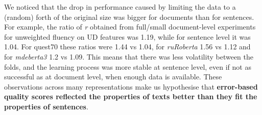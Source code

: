 We noticed that the drop in performance caused by limiting the data to a (random) forth of the original size was bigger for documents than for sentences. For example, the ratio of \textit{r} obtained from full/small document-level experiments for unweighted fluency on UD features was 1.19, while for sentence level it was 1.04. For quest70 these ratios were 1.44 vs 1.04, for \textit{ruRoberta} 1.56 vs 1.12 and for \textit{mdeberta3} 1.2 vs 1.09.
This means that there was less volatility between the folds, and the learning process was more stable at sentence level, even if not as successful as at document level, when enough data is available. 
These observations across many representations make us hypothesise that \textbf{error-based quality scores reflected the properties of texts better than they fit the properties of sentences}. 
